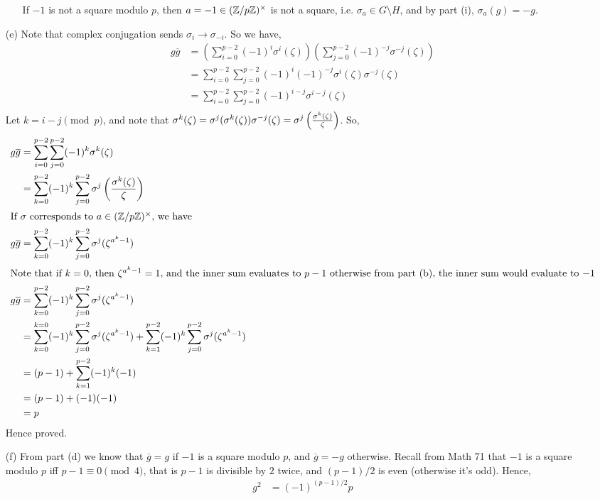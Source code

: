 \documentclass[12pt]{article}
\begin{document}
\begin{solution}
\begin{enumerate}
\begin{enumerate}
            If $-1$ is not a square modulo $p$, then $a = -1 \in (\Z/p\Z)^\times$ is not a square, i.e. $\sigma_a \in G \setminus H$, and by part (i), $\sigma_a(g) = - g$. 
        \end{enumerate}
        
        \item[(e)] Note that complex conjugation sends $\sigma_i \to \sigma_{-i}$. So we have, 
        \begin{align*}
            g\overline{g} &= \left(\sum_{i=0}^{p-2}(-1)^i\sigma^i(\zeta)\right)\left(\sum_{j=0}^{p-2}(-1)^{-j}\sigma^{-j}(\zeta)\right) \\ 
            &= \sum_{i=0}^{p-2}\sum_{j=0}^{p-2}(-1)^i(-1)^{-j}\sigma^i(\zeta)\sigma^{-j}(\zeta) \\
            &= \sum_{i=0}^{p-2}\sum_{j=0}^{p-2}(-1)^{i-j}\sigma^{i-j}(\zeta) \\ 
        \end{align*}
        Let $k = i-j \pmod p$, and note that $\sigma^k(\zeta) = \sigma^j(\sigma^k(\zeta))\sigma^{-j}(\zeta) = \sigma^j\left(\frac{\sigma^k(\zeta)}{\zeta}\right)$. So, 
        \begin{align*}
            g\overline{g}
            &= \sum_{i=0}^{p-2}\sum_{j=0}^{p-2}(-1)^{k}\sigma^{k}(\zeta) \\ 
            &= \sum_{k=0}^{p-2}(-1)^k\sum_{j=0}^{p-2}\sigma^j\left(\frac{\sigma^k(\zeta)}{\zeta}\right) \\ 
            \intertext{If $\sigma$ corresponds to $a \in (\mathbb Z/p\mathbb Z)^\times$, we have}
            g\overline{g} &= \sum_{k=0}^{p-2}(-1)^k\sum_{j=0}^{p-2}\sigma^j(\zeta^{a^{k}-1}) \\ 
            \intertext{Note that if $k = 0$, then $\zeta^{a^k-1} = 1$, and the inner sum evaluates to $p-1$ otherwise from part (b), the inner sum would evaluate to $-1$} 
            g\overline{g}
            &= \sum_{k=0}^{p-2}(-1)^k\sum_{j=0}^{p-2}\sigma^j(\zeta^{a^k-1})  \\
            &= \sum_{k=0}^{k=0}(-1)^k\sum_{j=0}^{p-2}\sigma^j(\zeta^{a^k-1})  + \sum_{k=1}^{p-2}(-1)^k\sum_{j=0}^{p-2}\sigma^j(\zeta^{a^k-1})  \\
            &= (p-1) + \sum_{k=1}^{p-2}(-1)^k(-1) \\
            &=(p-1) + (-1)(-1) \\ 
            &= p
        \end{align*}
        Hence proved. 

        \item[(f)] From part (d) we know that $\overline{g} = g$ if $-1$ is a square modulo $p$, and $\overline{g} = -g$ otherwise. Recall from Math 71 that $-1$ is a square modulo $p$ iff $p -1 \equiv 0 \pmod 4$, that is $p-1$ is divisible by $2$ twice, and $(p-1)/2$ is even (otherwise it's odd). Hence, 
        \begin{align*}
            g^2 &= (-1)^{(p-1)/2}p
        \end{align*}


\end{enumerate}
\end{solution}
\end{document}
